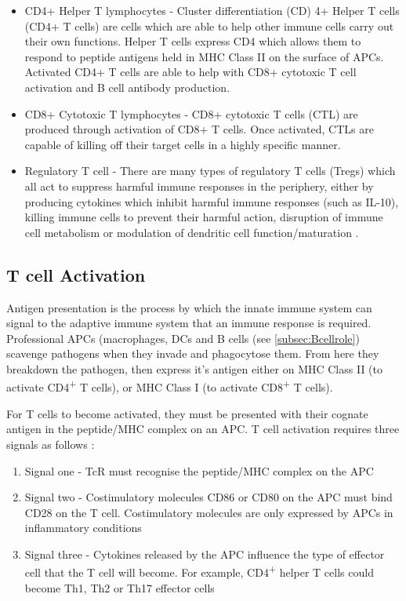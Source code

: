 \begin{itemize}
\item CD4+ Helper T lymphocytes - Cluster differentiation (CD) 4+ Helper T cells (CD4+ T cells) are cells which are able to help other immune cells carry out their own functions. 
Helper T cells express CD4 which allows them to respond to peptide antigens held in MHC Class II on the surface of APCs. 
Activated CD4+ T cells are able to help with CD8+ cytotoxic T cell activation and B cell antibody production.
\item CD8+ Cytotoxic T lymphocytes - CD8+ cytotoxic T cells (CTL) are produced through activation of CD8+ T cells.
Once activated, CTLs are capable of killing off their target cells in a highly specific manner.
\item Regulatory T cell - There are many types of regulatory T cells (Tregs) which all act to suppress harmful immune responses in the periphery, either by producing cytokines which inhibit harmful immune responses (such as IL-10), killing immune cells to prevent their harmful action, disruption of immune cell metabolism or modulation of dendritic cell function/maturation \citep{Vignali2008}. 
\end{itemize}

\subsection{T cell Activation}
\label{subsec:Tcellactivation}


Antigen presentation is the process by which the innate immune system can signal to the adaptive immune system that an immune response is required.
Professional APCs (macrophages, DCs and B cells (see \cref{subsec:Bcellrole}) scavenge pathogens when they invade and phagocytose them.
From here they breakdown the pathogen, then express it's antigen either on MHC Class II (to activate CD4\textsuperscript{+} T cells), or MHC Class I (to activate CD8\textsuperscript{+} T cells).

For T cells to become activated, they must be presented with their cognate antigen in the peptide/MHC complex on an APC.
T cell activation requires three signals as follows \citep{Corthay2006}:
\begin{enumerate}
\item Signal one - TcR must recognise the peptide/MHC complex on the APC
\item Signal two - Costimulatory molecules CD86 or CD80 on the APC must bind CD28 on the T cell. Costimulatory molecules are only expressed by APCs in inflammatory conditions
\item Signal three - Cytokines released by the APC influence the type of effector cell that the T cell will become. For example, CD4\textsuperscript{+} helper T cells could become Th1, Th2 or Th17 effector cells \citep{Kapsenberg2003}
\end{enumerate}

